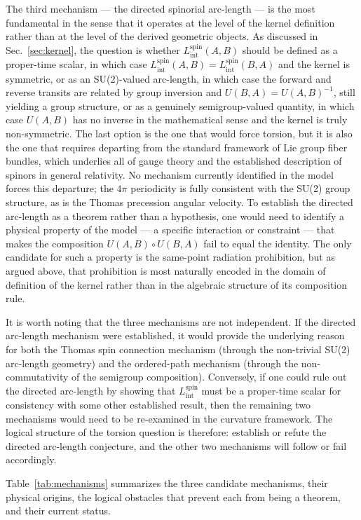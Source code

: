\documentclass[%
 reprint,
 amsmath,amssymb,
 aps,
 prb,
]{revtex4-2}
\numberwithin{equation}{section}
\newcommand{\Lspin}{L_{\text{int}}^{\text{spin}}}
\begin{document}
The third mechanism --- the directed spinorial arc-length --- is the most fundamental in the sense that it operates at the level of the kernel definition rather than at the level of the derived geometric objects. As discussed in Sec.~\ref{sec:kernel}, the question is whether $\Lspin(A,B)$ should be defined as a proper-time scalar, in which case $\Lspin(A,B) = \Lspin(B,A)$ and the kernel is symmetric, or as an SU(2)-valued arc-length, in which case the forward and reverse transits are related by group inversion and $U(B,A) = U(A,B)^{-1}$, still yielding a group structure, or as a genuinely semigroup-valued quantity, in which case $U(A,B)$ has no inverse in the mathematical sense and the kernel is truly non-symmetric. The last option is the one that would force torsion, but it is also the one that requires departing from the standard framework of Lie group fiber bundles, which underlies all of gauge theory and the established description of spinors in general relativity. No mechanism currently identified in the model forces this departure; the $4\pi$ periodicity is fully consistent with the SU(2) group structure, as is the Thomas precession angular velocity. To establish the directed arc-length as a theorem rather than a hypothesis, one would need to identify a physical property of the model --- a specific interaction or constraint --- that makes the composition $U(A,B)\circ U(B,A)$ fail to equal the identity. The only candidate for such a property is the same-point radiation prohibition, but as argued above, that prohibition is most naturally encoded in the domain of definition of the kernel rather than in the algebraic structure of its composition rule.

It is worth noting that the three mechanisms are not independent. If the directed arc-length mechanism were established, it would provide the underlying reason for both the Thomas spin connection mechanism (through the non-trivial SU(2) arc-length geometry) and the ordered-path mechanism (through the non-commutativity of the semigroup composition). Conversely, if one could rule out the directed arc-length by showing that $\Lspin$ must be a proper-time scalar for consistency with some other established result, then the remaining two mechanisms would need to be re-examined in the curvature framework. The logical structure of the torsion question is therefore: establish or refute the directed arc-length conjecture, and the other two mechanisms will follow or fail accordingly.

Table~\ref{tab:mechanisms} summarizes the three candidate mechanisms, their physical origins, the logical obstacles that prevent each from being a theorem, and their current status.
\end{document}
